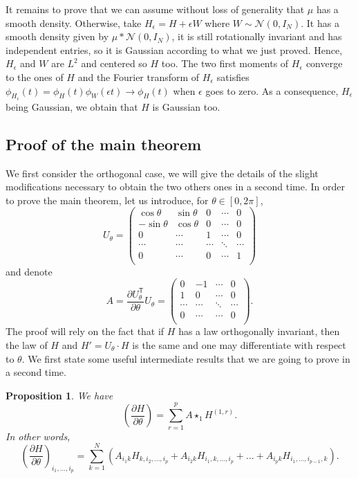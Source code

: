 \documentclass[pdftex]{sigma}
\numberwithin{equation}{section}
\newtheorem{Proposition}[Theorem]{Proposition}
\theoremstyle{definition}
\begin{document}
It remains to prove that we can assume without loss of generality that $\mu$ has a smooth density. Otherwise, take $H_{\epsilon}=H+\epsilon W$ where $W \sim \mathcal{N}(0,I_N)$. It has a smooth density given by $\mu * \mathcal{N}(0,I_N)$, it is still rotationally invariant and has independent entries, so it is Gaussian according to what we just proved. Hence, $H_{\epsilon}$ and $W$ are $L^2$ and centered so $H$ too. The two first moments of $H_{\epsilon}$ converge to the ones of $H$ and the Fourier transform of $H_{\epsilon}$ satisfies~${\phi_{H_{\epsilon}}(t)=\phi_H(t)\phi_{W}(\epsilon t) \rightarrow \phi_H(t)}$ when $\epsilon$ goes to zero. As a consequence, $H_{\epsilon}$ being Gaussian, we obtain that $H$ is Gaussian too.


\subsection{Proof of the main theorem}

We first consider the orthogonal case, we will give the details of the slight modifications necessary to obtain the two others ones in a second time. In order to prove the main theorem, let us introduce, for $\theta \in [0,2\pi]$,
\[U_{\theta}=\begin{pmatrix}
    \cos{\theta} & \sin{\theta} & 0 & \cdots & 0 \\
    -\sin{\theta} & \cos\theta & 0 & \cdots & 0 \\
    0 & \cdots & 1 & \cdots & 0 \\
    \cdots & \cdots & \cdots & \ddots & \cdots \\
    0 & \cdots & 0 & \cdots & 1 \\
\end{pmatrix}\]
and denote
\[ A= \frac{\partial U_{\theta}^{\mathsf T}}{\partial \theta} U_{\theta} = \begin{pmatrix}
    0 & -1 &  \cdots & 0 \\
    1 & 0 &  \cdots & 0 \\
    \cdots & \cdots & \ddots & \cdots \\
    0 & \cdots  & \cdots & 0 \\
\end{pmatrix}.\]
The proof will rely on the fact that if $H$ has a law orthogonally invariant, then the law of $H$ and $H'=U_{\theta} \cdot H$ is the same and one may differentiate with respect to $\theta$. We first state some useful intermediate results that we are going to prove in a second time.
\begin{Proposition}\label{derivatives}
We have
    \[ \left( \frac{\partial H}{\partial \theta} \right) = \sum_{r=1}^p A \star_1 H^{(1,r)}. \]
In other words,
\[\left( \frac{\partial H}{\partial \theta} \right)_{i_1,\dots,i_p} = \sum_{k=1}^N (A_{i_1k}H_{k,i_2,\dots,i_p} + A_{i_2k}H_{i_1,k,\dots,i_p} + \dots + A_{i_pk}H_{i_1,\dots,i_{p-1},k}).\]
\end{Proposition}
\end{document}
